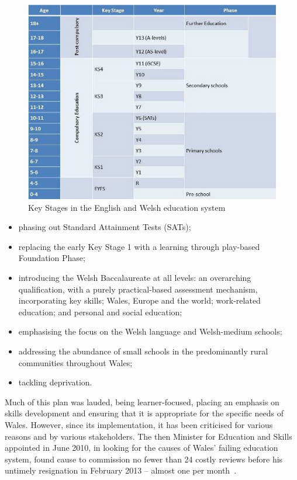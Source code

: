 \documentclass{sig-alternate}
\begin{document}
\begin{figure}[!ht]
  \centering
  \includegraphics[width=0.9\columnwidth]{images/keystages.png}
  \caption{Key Stages in the English and Welsh education system}
  \label{fig:key-stages}
\end{figure}

\begin{itemize}
\item phasing out Standard Attainment Tests (SATs);
\item replacing the early Key Stage 1 with a learning through play-based Foundation Phase;
\item introducing the Welsh Baccalaureate at all levels: an
  overarching qualification, with a purely practical-based assessment
  mechanism, incorporating key skills; Wales, Europe and the world;
  work-related education; and personal and social education;
\item emphasising the focus on the Welsh language and  Welsh-medium
  schools;
\item addressing the abundance of small schools in the  predominantly
  rural communities throughout Wales;
\item tackling deprivation.
\end{itemize}

Much of this plan was lauded, being learner-focused, placing an
emphasis on skills development and ensuring that it is appropriate for
the specific needs of Wales. However, since its implementation, it has
been criticised for various reasons and by various stakeholders.  The
then Minister for Education and Skills appointed in June 2010, in
looking for the causes of Wales' failing education system, found cause
to commission no fewer than 24 costly reviews before his untimely
resignation in February 2013 -- almost one per
month~\cite{Evans:2015}.
\end{document}
